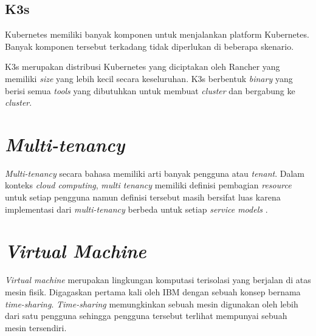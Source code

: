 \subsection{K3s}

Kubernetes memiliki banyak komponen untuk menjalankan platform Kubernetes. Banyak komponen
tersebut terkadang tidak diperlukan di beberapa skenario. 

K3s merupakan distribusi Kubernetes yang diciptakan oleh Rancher yang
memiliki \emph{size} yang lebih kecil secara keseluruhan. K3s berbentuk
\emph{binary} yang berisi semua \emph{tools} yang dibutuhkan untuk membuat
\emph{cluster} dan bergabung ke \emph{cluster}.

\section{\emph{Multi-tenancy}}
\label{sec:multi-tenancy}

\emph{Multi-tenancy} secara bahasa memiliki arti banyak pengguna atau \emph{tenant}. Dalam konteks
\emph{cloud computing}, \emph{multi tenancy} memiliki definisi pembagian \emph{resource} 
untuk setiap pengguna namun definisi tersebut masih bersifat luas karena implementasi
dari \emph{multi-tenancy} berbeda untuk setiap \emph{service models} \parencite{6830928}.

\section{\emph{Virtual Machine}}
\label{sec:virtual-machine}

\emph{Virtual machine} merupakan lingkungan komputasi terisolasi
yang berjalan di atas mesin fisik. Digagaskan pertama kali oleh IBM
dengan sebuah konsep bernama \emph{time-sharing}. \emph{Time-sharing}
memungkinkan sebuah mesin digunakan oleh lebih dari satu pengguna sehingga
pengguna tersebut terlihat mempunyai sebuah mesin tersendiri.

